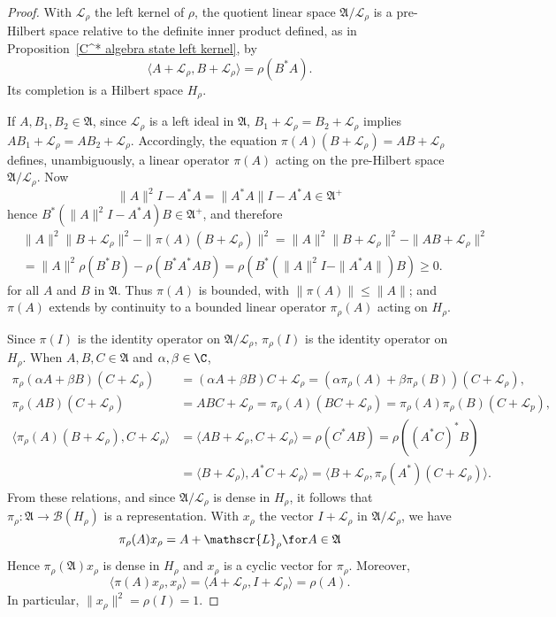 \begin{proof}
With $\mathscr{L}_\rho$ the left kernel of $\rho$, the quotient linear space $\mathfrak{A}/\mathscr{L}_\rho$ is a pre-Hilbert space relative to the definite inner product defined, as in Proposition~\ref{C^* algebra state left kernel}, by
\[\langle A+\mathscr{L}_\rho,B+\mathscr{L}_\rho\rangle=\rho(B^*A).\]
Its completion is a Hilbert space $H_\rho$.\par
If $A,B_1,B_2\in\mathfrak{A}$, since $\mathscr{L}_\rho$ is a left ideal in $\mathfrak{A}$, $B_1+\mathscr{L}_\rho=B_2+\mathscr{L}_\rho$ implies $AB_1+\mathscr{L}_\rho=AB_2+\mathscr{L}_\rho$. Accordingly, the equation $\pi(A)(B+\mathscr{L}_\rho)=AB+\mathscr{L}_\rho$ defines, unambiguously, a linear operator $\pi(A)$ acting on the pre-Hilbert space $\mathfrak{A}/\mathscr{L}_\rho$. Now
\[\|A\|^2I-A^*A=\|A^*A\|I-A^*A\in\mathfrak{A}^+\]
hence $B^*(\|A\|^2I-A^*A)B\in\mathfrak{A}^+$, and therefore
\begin{align*}
&\|A\|^2\|B+\mathscr{L}_\rho\|^2-\|\pi(A)(B+\mathscr{L}_\rho)\|^2=\|A\|^2\|B+\mathscr{L}_\rho\|^2-\|AB+\mathscr{L}_\rho\|^2\\
&=\|A\|^2\rho(B^*B)-\rho(B^*A^*AB)=\rho(B^*(\|A\|^2I-\|A^*A\|)B)\geq 0.
\end{align*}
for all $A$ and $B$ in $\mathfrak{A}$. Thus $\pi(A)$ is bounded, with $\|\pi(A)\|\leq\|A\|$; and $\pi(A)$ extends by continuity to a bounded linear operator $\pi_\rho(A)$ acting on $H_\rho$.\par
Since $\pi(I)$ is the identity operator on $\mathfrak{A}/\mathscr{L}_\rho$, $\pi_\rho(I)$ is the identity operator on $H_\rho$. When $A,B,C\in\mathfrak{A}$ and $\alpha,\beta\in\C$,
\begin{align*}
\pi_\rho(\alpha A+\beta B)(C+\mathscr{L}_\rho)&=(\alpha A+\beta B)C+\mathscr{L}_\rho=(\alpha\pi_\rho(A)+\beta\pi_\rho(B))(C+\mathscr{L}_\rho),\\
\pi_\rho(AB)(C+\mathscr{L}_\rho)&=ABC+\mathscr{L}_\rho=\pi_\rho(A)(BC+\mathscr{L}_\rho)=\pi_\rho(A)\pi_\rho(B)(C+\mathscr{L}_p),\\
\langle\pi_\rho(A)(B+\mathscr{L}_\rho),C+\mathscr{L}_\rho\rangle&=\langle AB+\mathscr{L}_\rho,C+\mathscr{L}_\rho\rangle=\rho(C^*AB)=\rho((A^*C)^*B)\\
&=\langle B+\mathscr{L}_\rho),A^*C+\mathscr{L}_\rho\rangle=\langle B+\mathscr{L}_\rho,\pi_\rho(A^*)(C+\mathscr{L}_\rho)\rangle.
\end{align*}
From these relations, and since $\mathfrak{A}/\mathscr{L}_\rho$ is dense in $H_\rho$, it follows that $\pi_\rho:\mathfrak{A}\to\mathcal{B}(H_\rho)$ is a representation. With $x_\rho$ the vector $I+\mathscr{L}_\rho$ in $\mathfrak{A}/\mathscr{L}_\rho$, we have
\[\pi_\rho(A)x_\rho=A+\mathscr{L}_\rho\for A\in\mathfrak{A}\]
Hence $\pi_\rho(\mathfrak{A})x_\rho$ is dense in $H_\rho$ and $x_\rho$ is a cyclic vector for $\pi_\rho$. Moreover,
\[\langle\pi(A)x_\rho,x_\rho\rangle=\langle A+\mathscr{L}_\rho,I+\mathscr{L}_\rho\rangle=\rho(A).\]
In particular, $\|x_\rho\|^2=\rho(I)=1$.
\end{proof}
